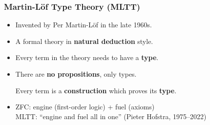 \documentclass{beamer} %
\begin{document}
\begin{frame}
  \frametitle{Martin-L\"of Type Theory (MLTT)}

  \begin{itemize}
    \item Invented by Per Martin-L\"of in the late 1960s.
    \item A formal theory in \textbf{natural deduction} style.
    \item Every term in the theory needs to have a \textbf{type}.
    \item There are \textbf{no propositions}, only types.

    Every term is a \textbf{construction} which proves its \textbf{type}.

    \begin{center}
    \end{center}
    \item ZFC: engine (first-order logic) + fuel (axioms) \\
    MLTT: ``engine and fuel all in one'' (Pieter Hofstra, 1975--2022) 
  \end{itemize}
  
\end{frame}
\end{document}
